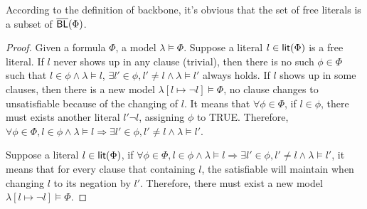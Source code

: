 According to the definition of backbone, it's obvious that the set of free literals is a subset of $\overline{\textsf{BL}}(\Phi)$.
\begin{proof}
\label{pro:free literal}
Given a formula $\Phi$, a model $\lambda\models\Phi$.
Suppose a literal $l\in\textsf{lit}(\Phi)$ is a free literal. If $l$ never shows up in any clause (trivial), then there is no such $\phi\in\Phi$ such that $l\in\phi\wedge\lambda\models l$, $\exists l'\in\phi, l'\neq l\wedge\lambda\models l'$ always holds. If $l$ shows up in some clauses, then there is a new model $\lambda[l\mapsto\neg l]\models\Phi$, no clause changes to unsatisfiable because of the changing of $l$. It means that $\forall\phi\in\Phi$, if $l\in\phi$, there must exists another literal $l'\neg l$, assigning $\phi$ to TRUE. Therefore, $\forall\phi\in\Phi, l\in\phi\wedge\lambda\models l \Longrightarrow \exists l'\in\phi, l'\neq l\wedge\lambda\models l'$.

Suppose a literal $l\in\textsf{lit}(\Phi)$, if $\forall\phi\in\Phi, l\in\phi\wedge\lambda\models l \Longrightarrow \exists l'\in\phi, l'\neq l\wedge\lambda\models l'$, it means that for every clause that containing $l$, the satisfiable will maintain when changing $l$ to its negation by $l'$. Therefore, there must exist a new model $\lambda[l\mapsto\neg l]\models\Phi$.
\end{proof}



